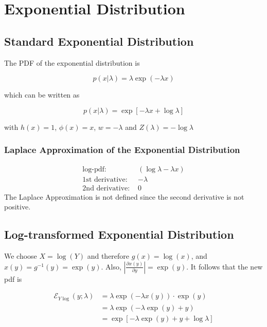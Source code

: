 \section{Exponential Distribution}

\subsection{Standard Exponential Distribution}

The PDF of the exponential distribution is

\begin{equation}
	p(x| \lambda) = \lambda \exp(-\lambda x)
	\label{eq:exponential_pdf}
\end{equation}

which can be written as

\begin{equation}
	p(x|\lambda) = \exp\left[-\lambda x + \log\lambda\right]
	\label{eq:exponential_exp_family}
\end{equation}

with $h(x) = 1$, $\phi(x)=x$, $w = -\lambda$ and $Z(\lambda) = -\log\lambda$

\subsubsection{Laplace Approximation of the Exponential Distribution}

\begin{align*}
\text{log-pdf: } &\left( \log \lambda - \lambda x\right) \\
\text{1st derivative: }& - \lambda \\
\text{2nd derivative: }& 0
\end{align*}
The Laplace Approximation is not defined since the second derivative is not positive. 

\subsection{Log-transformed Exponential Distribution}

We choose $X = \log(Y)$ and therefore $g(x) = \log(x)$, and $x(y) = g^{-1}(y) = \exp(y)$. Also, $\left\vert \frac{\partial x(y)}{\partial y}\right\vert = \exp(y)$. It follows that the new pdf is 

\begin{align}
	\mathcal{E}_{Y\log}(y; \lambda) &= \lambda \exp(-\lambda x(y)) \cdot \exp(y) \\ \nonumber
	&= \lambda \exp(-\lambda \exp(y) + y) \\
	&=  \exp\left[-\lambda \exp(y) + y + \log\lambda\right]
\end{align}

